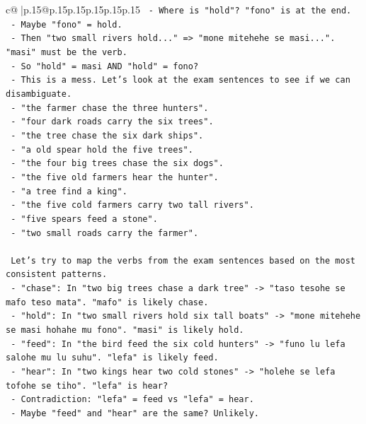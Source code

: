 \documentclass{article}
\begin{document}
{\begin{supertabular}{c@{$\;$}|p{.15\linewidth}@{}p{.15\linewidth}p{.15\linewidth}p{.15\linewidth}p{.15\linewidth}p{.15\linewidth}}
{{{\texttt{        {-} Where is "hold"? "fono" is at the end.} \\
\texttt{        {-} Maybe "fono" = hold.} \\
\texttt{        {-} Then "two small rivers hold..." => "mone mitehehe se masi...". "masi" must be the verb.} \\
\texttt{        {-} So "hold" = masi AND "hold" = fono?} \\
\texttt{        {-} This is a mess. Let's look at the exam sentences to see if we can disambiguate.} \\
\texttt{        {-} "the farmer chase the three hunters".} \\
\texttt{        {-} "four dark roads carry the six trees".} \\
\texttt{        {-} "the tree chase the six dark ships".} \\
\texttt{        {-} "a old spear hold the five trees".} \\
\texttt{        {-} "the four big trees chase the six dogs".} \\
\texttt{        {-} "the five old farmers hear the hunter".} \\
\texttt{        {-} "a tree find a king".} \\
\texttt{        {-} "the five cold farmers carry two tall rivers".} \\
\texttt{        {-} "five spears feed a stone".} \\
\texttt{        {-} "two small roads carry the farmer".} \\
\\ 
\texttt{        Let's try to map the verbs from the exam sentences based on the most consistent patterns.} \\
\texttt{        {-} "chase": In "two big trees chase a dark tree" {-}> "taso tesohe se mafo teso mata". "mafo" is likely chase.} \\
\texttt{        {-} "hold": In "two small rivers hold six tall boats" {-}> "mone mitehehe se masi hohahe mu fono". "masi" is likely hold.} \\
\texttt{        {-} "feed": In "the bird feed the six cold hunters" {-}> "funo lu lefa salohe mu lu suhu". "lefa" is likely feed.} \\
\texttt{        {-} "hear": In "two kings hear two cold stones" {-}> "holehe se lefa tofohe se tiho". "lefa" is hear?} \\
\texttt{        {-} Contradiction: "lefa" = feed vs "lefa" = hear.} \\
\texttt{        {-} Maybe "feed" and "hear" are the same? Unlikely.} \\
}}}
\end{supertabular}}
\end{document}
